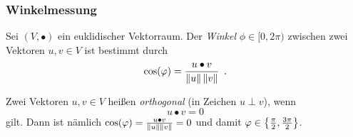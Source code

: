 \documentclass{beamer}
\begin{document}
\begin{frame} \frametitle{Winkelmessung}
	Sei $(V,\bullet)$ ein euklidischer Vektorraum. Der \emph{Winkel} $\phi \in [0,2\pi)$ zwischen zwei Vektoren $u,v \in V$ ist bestimmt durch
	\begin{equation*}
		\cos(\varphi) = \frac{u \bullet v}{\left\lVert u \right\rVert \left\lVert v \right\rVert} \enskip \text{.}
	\end{equation*}

	Zwei Vektoren $u,v \in V$ heißen \emph{orthogonal} (in Zeichen $u \perp v$), wenn 
	\begin{equation*}
		u \bullet v = 0
	\end{equation*}
	gilt. Dann ist nämlich $\cos(\varphi) = \frac{u \bullet v}{\left\lVert u \right\rVert \left\lVert v \right\rVert} = 0$ und damit $\varphi \in \left\{ \tfrac{\pi}{2}, \tfrac{3\pi}{2} \right\}$.
\end{frame}
\end{document}
